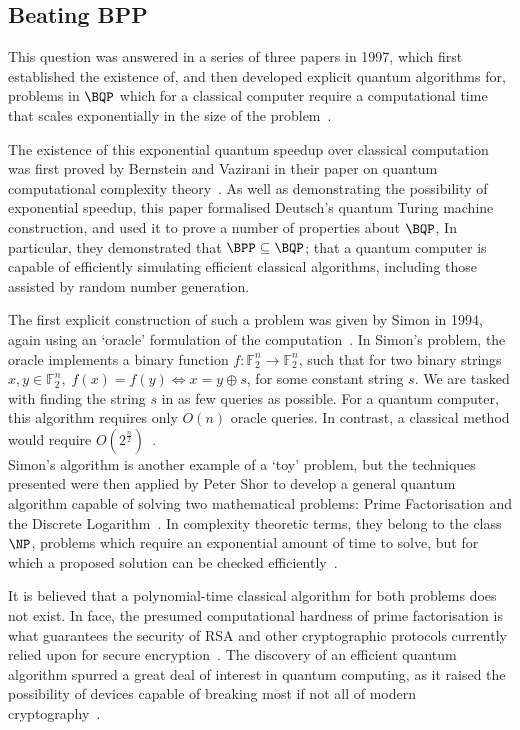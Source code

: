 \documentclass{standalone}
\begin{document}
\subsection{Beating BPP}\label{sec:exponentialspeedup}
This question was answered in a series of three papers in 1997, which first established the existence of, and then developed explicit quantum algorithms for, problems in $\BQP$ which for a classical computer require a computational time that scales exponentially in the size of the problem~\cite{Bennett1997}. 
\par
The existence of this exponential quantum speedup over classical computation was first proved by Bernstein and Vazirani in their paper on quantum computational complexity theory~\cite{Bernstein1997}. As well as demonstrating the possibility of exponential speedup, this paper formalised Deutsch's quantum Turing machine construction, and used it to prove a number of properties about $\BQP$, In particular, they demonstrated that $\BPP\subseteq\BQP$; that a quantum computer is capable of efficiently simulating efficient classical algorithms, including those assisted by random number generation.
\par
The first explicit construction of such a problem was given by Simon in 1994, again using an `oracle' formulation of the computation~\cite{Division1998a}. In Simon's problem, the oracle implements a binary function $f: \mathbb{F}_{2}^{n}\rightarrow\mathbb{F}_{2}^{n}$, such that for two binary strings $x,y\in\mathbb{F}_{2}^{n},\;f(x)=f(y)\Leftrightarrow x = y \oplus s$, for some constant string $s$. We are tasked with finding the string $s$ in as few queries as possible. For a quantum computer, this algorithm requires only $O(n)$ oracle queries. In contrast, a classical method would require $O\left(2^{\frac{n}{2}}\right)$~\cite{Division1998a}.\\
Simon's algorithm is another example of a `toy' problem, but the techniques presented were then applied by Peter Shor to develop a general quantum algorithm capable of solving two mathematical problems: Prime Factorisation and the Discrete Logarithm~\cite{Division1998a,Shor1997}. In complexity theoretic terms, they belong to the class $\NP$, problems which require an exponential amount of time to solve, but for which a proposed solution can be checked efficiently~\cite{Bennett1997}.
\par
It is believed that a polynomial-time classical algorithm for both problems does not exist. In face, the presumed computational hardness of prime factorisation is what guarantees the security of RSA and other cryptographic protocols currently relied upon for secure encryption~\cite{Nielsen2000}. The discovery of an efficient quantum algorithm spurred a great deal of interest in quantum computing, as it raised the possibility of devices capable of breaking most if not all of modern cryptography~\cite{Shor1997}. 
\end{document}
